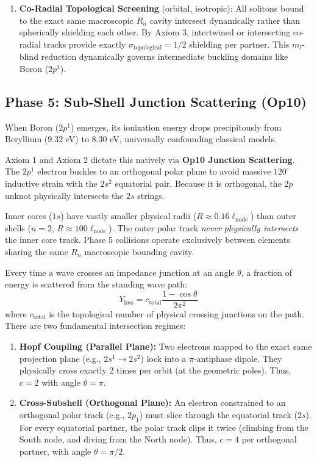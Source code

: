\begin{enumerate}
\begin{equation}
              Z_{\text{eff\_expanded}} = \frac{Z_{\text{eff\_core}}}{\sqrt{1 + k_{\text{topo}}}} 
          \end{equation}
          where $k_{\text{topo}} = p_c/2 \approx 0.091$ represents the resonant gap of crossing unknots by Axiom 3.
    \item \textbf{Co-Radial Topological Screening} (orbital, isotropic):
          All solitons bound to the exact same macroscopic $R_n$ cavity intersect dynamically rather than spherically shielding each other. By Axiom 3, intertwined or intersecting co-radial tracks provide exactly $\sigma_{\text{topological}} = 1/2$ shielding per partner. This $m_l$-blind reduction dynamically governs intermediate buckling domains like Boron ($2p^1$).
\end{enumerate}
\subsection{Phase 5: Sub-Shell Junction Scattering (Op10)}

When Boron ($2p^1$) emerges, its ionization energy drops precipitously from Beryllium ($9.32$ eV) to $8.30$ eV, universally confounding classical models.

Axiom 1 and Axiom 2 dictate this natively via \textbf{Op10 Junction Scattering}. The $2p^1$ electron buckles to an orthogonal polar plane to avoid massive $120^{\circ}$ inductive strain with the $2s^2$ equatorial pair. Because it is orthogonal, the $2p$ unknot physically intersects the $2s$ strings.

Inner cores ($1s$) have vastly smaller physical radii ($R \approx 0.16 \ell_{\text{node}}$) than outer shells ($n=2$, $R \approx 100 \ell_{\text{node}}$). The outer polar track \textit{never physically intersects} the inner core track. Phase 5 collisions operate exclusively between elements sharing the same $R_n$ macroscopic bounding cavity.

Every time a wave crosses an impedance junction at an angle $\theta$, a fraction of energy is scattered from the standing wave path:
\begin{equation}
\label{eq:junction_loss}
Y_{\text{loss}} = c_{\text{total}} \frac{1 - \cos\theta}{2\pi^2}
\end{equation}
where $c_{\text{total}}$ is the topological number of physical crossing junctions on the path. There are two fundamental intersection regimes:
\begin{enumerate}
    \item \textbf{Hopf Coupling (Parallel Plane):} Two electrons mapped to the exact same projection plane (e.g., $2s^1 \rightarrow 2s^2$) lock into a $\pi$-antiphase dipole. They physically cross exactly 2 times per orbit (at the geometric poles). Thus, $c=2$ with angle $\theta = \pi$.
    \item \textbf{Cross-Subshell (Orthogonal Plane):} An electron constrained to an orthogonal polar track (e.g., $2p_1$) must slice through the equatorial track ($2s$). For every equatorial partner, the polar track clips it twice (climbing from the South node, and diving from the North node). Thus, $c=4$ per orthogonal partner, with angle $\theta = \pi/2$.
\end{enumerate}

